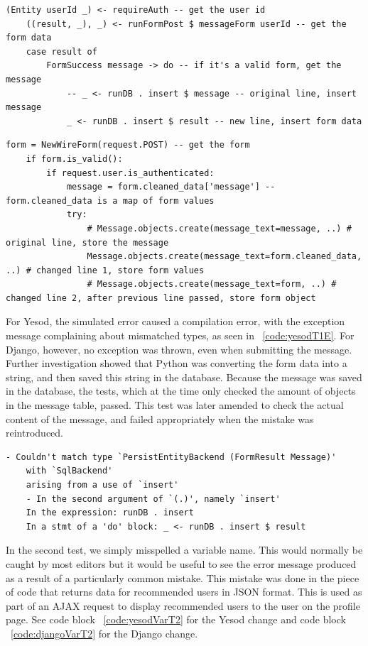 \begin{lstlisting}[caption={Yesod Code Change},label={code:yesodMessageT1L}]
	(Entity userId _) <- requireAuth -- get the user id
	((result, _), _) <- runFormPost $ messageForm userId -- get the form data
	case result of
		FormSuccess message -> do -- if it's a valid form, get the message
			-- _ <- runDB . insert $ message -- original line, insert message
			_ <- runDB . insert $ result -- new line, insert form data
\end{lstlisting}

\begin{lstlisting}[caption={Django Code Change},label={code:djangoMessageT1L}]
	form = NewWireForm(request.POST) -- get the form
	if form.is_valid():
		if request.user.is_authenticated:
			message = form.cleaned_data['message'] -- form.cleaned_data is a map of form values
			try:
				# Message.objects.create(message_text=message, ..) # original line, store the message
				Message.objects.create(message_text=form.cleaned_data, ..) # changed line 1, store form values
				# Message.objects.create(message_text=form, ..) # changed line 2, after previous line passed, store form object
\end{lstlisting}

For Yesod, the simulated error caused a compilation error, with the exception
message complaining about mismatched types, as seen in ~\ref{code:yesodT1E}. 
For Django, however, no exception was thrown, even when submitting the message. 
Further investigation showed that Python was converting the form data into a
string, and then saved this string in the database. Because the message was saved 
in the database, the tests, which at the time only checked the amount of objects
in the message table, passed. This test was later amended to check the actual
content of the message, and failed appropriately when the mistake was reintroduced.

\begin{lstlisting}[caption={Yesod Exception Message},label={code:yesodT1E}]
	- Couldn't match type `PersistEntityBackend (FormResult Message)'
	with `SqlBackend'
	arising from a use of `insert'
	- In the second argument of `(.)', namely `insert'
	In the expression: runDB . insert
	In a stmt of a 'do' block: _ <- runDB . insert $ result
\end{lstlisting}

In the second test, we simply misspelled a variable name. This would normally
be caught by most editors but it would be useful to see the error message produced
as a result of a particularly common mistake. This mistake was done in the piece
of code that returns data for recommended users in JSON format. This is used
as part of an AJAX request to display recommended users to the user on the
profile page. See code block ~\ref{code:yesodVarT2} for the Yesod change and
code block ~\ref{code:djangoVarT2} for the Django change.

